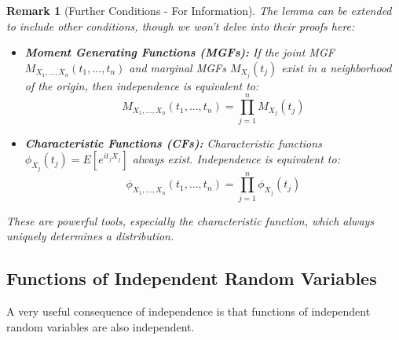 \documentclass[11pt]{article}
\newtheorem{remark}[theorem]{Remark}
\begin{document}
\begin{remark}[Further Conditions - For Information]
The lemma can be extended to include other conditions, though we won't delve into their proofs here:
\begin{itemize}
    \item \textbf{Moment Generating Functions (MGFs):} If the joint MGF $M_{X_1, \dots, X_n}(t_1, \dots, t_n)$ and marginal MGFs $M_{X_j}(t_j)$ exist in a neighborhood of the origin, then independence is equivalent to:
    \begin{equation}
    M_{X_1, \dots, X_n}(t_1, \dots, t_n) = \prod_{j=1}^n M_{X_j}(t_j)
    \end{equation}
    \item \textbf{Characteristic Functions (CFs):} Characteristic functions $\phi_{X_j}(t_j) = E[e^{it_jX_j}]$ always exist. Independence is equivalent to:
    \begin{equation}
    \phi_{X_1, \dots, X_n}(t_1, \dots, t_n) = \prod_{j=1}^n \phi_{X_j}(t_j)
    \end{equation}
\end{itemize}
These are powerful tools, especially the characteristic function, which always uniquely determines a distribution.
\end{remark}

\subsection{Functions of Independent Random Variables}

A very useful consequence of independence is that functions of independent random variables are also independent.
\end{document}
